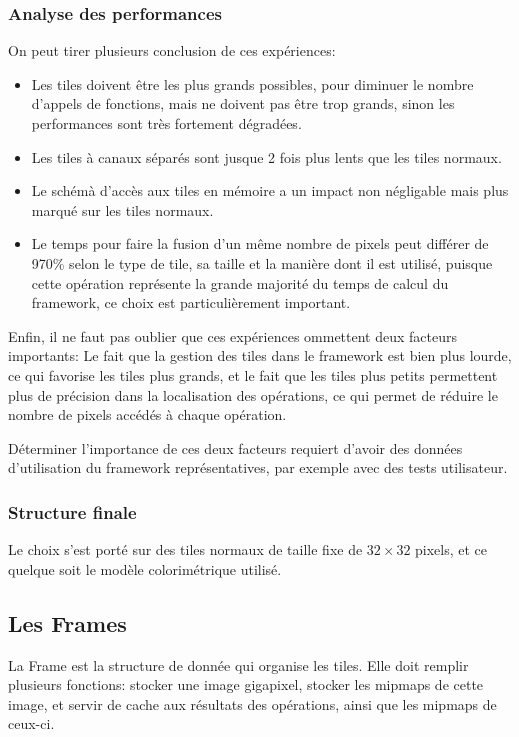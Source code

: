 		\subsubsection{Analyse des performances}
			On peut tirer plusieurs conclusion de ces expériences:
			\begin{itemize}
				\item Les tiles doivent être les plus grands possibles, pour diminuer le 
			nombre d'appels de fonctions, mais ne doivent pas être trop grands, sinon les performances sont très fortement dégradées. 
				\item Les tiles à canaux séparés sont jusque 2 fois plus lents que les tiles normaux.
				\item Le schémà d'accès aux tiles en mémoire a un impact non négligable mais plus marqué sur les tiles normaux.
				\item Le temps pour faire la fusion d'un même nombre de pixels peut différer de 970\% selon le type de tile, sa taille et la
				manière dont il est utilisé, puisque cette opération représente la grande majorité du temps de calcul du framework, ce choix
				est particulièrement important.
			\end{itemize}
			Enfin, il ne faut pas oublier que ces expériences ommettent deux facteurs importants: Le fait que la gestion des tiles dans le framework 
			est bien plus lourde, ce qui favorise les tiles plus grands, et le fait que les tiles plus petits permettent plus de précision dans 
			la localisation des opérations, ce qui permet de réduire le nombre de pixels accédés à chaque opération.

			Déterminer l'importance de ces deux facteurs requiert d'avoir des données d'utilisation du framework représentatives, par exemple
			avec des tests utilisateur. 
		\subsubsection{Structure finale}
			Le choix s'est porté sur des tiles normaux de taille fixe de $32\times32$ pixels, et ce quelque soit le modèle colorimétrique utilisé.

		\subsection{Les Frames}
			La Frame est la structure de donnée qui organise les tiles. Elle doit remplir plusieurs fonctions: stocker une image gigapixel,
			stocker les mipmaps de cette image, et servir de cache aux résultats des opérations, ainsi que les mipmaps de ceux-ci.

